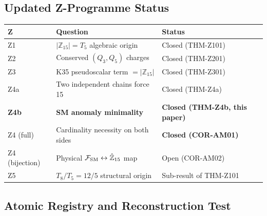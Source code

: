 \documentclass[12pt, a4paper]{article}
\begin{document}
\subsection{Updated Z-Programme Status}
\label{sec:status}

\begin{derivedbox}[title={Z-Programme status after TASK-ZC09 (Z4b)}]
{\small
\renewcommand{\arraystretch}{1.30}
\begin{tabular}{p{0.9cm} p{7.5cm} p{3.5cm}}
\toprule
\textbf{Z} & \textbf{Question} & \textbf{Status} \\
\midrule
Z1 & $|\mathbb{Z}_{15}| = T_5$ algebraic origin
  & Closed (THM-Z101) \\
Z2 & Conserved $(Q_3, Q_5)$ charges
  & Closed (THM-Z201) \\
Z3 & K35 pseudoscalar term $= |\mathbb{Z}_{15}|$
  & Closed (THM-Z301) \\
Z4a & Two independent chains force 15
  & Closed (THM-Z4a) \\
\textbf{Z4b} & \textbf{SM anomaly minimality}
  & \textbf{Closed (THM-Z4b, this paper)} \\
Z4 (full) & Cardinality necessity on both sides
  & \textbf{Closed (COR-AM01)} \\
Z4 (bijection) & Physical $\mathcal{F}_{\rm SM} \leftrightarrow
  \hat{\mathbb{Z}}_{15}$ map
  & Open (COR-AM02) \\
Z5 & $T_8/T_5 = 12/5$ structural origin
  & Sub-result of THM-Z101 \\
\bottomrule
\end{tabular}
}
\end{derivedbox}

\subsection{Atomic Registry and Reconstruction Test}
\label{sec:registry}
\end{document}
